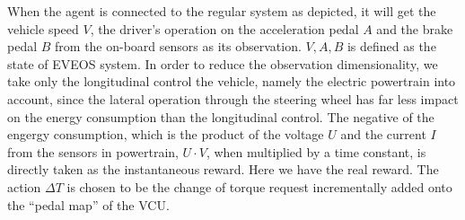 \documentclass{article}
\begin{document}
When the agent is connected to the regular system as depicted, it will get the vehicle speed $V$, the driver's operation on the acceleration pedal $A$ and the brake pedal $B$ from the on-board sensors as its observation. $V, A, B$ is defined as the state of EVEOS system. In order to reduce the observation dimensionality, we take only the longitudinal control the vehicle, namely the electric powertrain into account, since the lateral operation through the steering wheel has far less impact on the energy consumption than the longitudinal control. The negative of the engergy consumption, which is the product of the voltage $U$ and the current $I$ from the sensors in powertrain, $U\cdot V$, when multiplied by a time constant, is directly taken as the instantaneous reward. Here we have the real reward. The action $\Delta T$ is chosen to be the change of torque request incrementally added onto the ``pedal map'' of the VCU\@.
\end{document}
